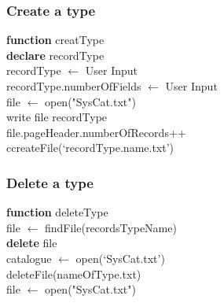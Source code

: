 \documentclass[12pt,a4paper]{article}
\begin{document}
        \subsubsection{Create a type}
        \IncMargin{1em}
            \begin{algorithm}[H]
                \SetAlgoLined
                 \textbf{function} creatType \\
                 \textbf{declare} recordType \\
                 recordType $\leftarrow$ User Input \\
                 recordType.numberOfFields $\leftarrow$ User Input \\
                 
                 file $\leftarrow$ open("SysCat.txt") \\
                 write file recordType \\
                 file.pageHeader.numberOfRecords++ \\
                 ccreateFile(‘recordType.name.txt’)
                 
            \end{algorithm}
        \DecMargin{1em}
        \subsubsection{Delete a type}
        \IncMargin{1em}
            \begin{algorithm}[H]
                \SetAlgoLined
                 \textbf{function} deleteType \\
                 file $\leftarrow$ findFile(recordsTypeName) \\
                  \textbf{delete} file \\
                  catalogue $\leftarrow$ open(‘SysCat.txt’) \\
                 deleteFile(nameOfType.txt) \\
                 file $\leftarrow$ open("SysCat.txt") \\
                 
            \end{algorithm}
        \DecMargin{1em}
\end{document}
